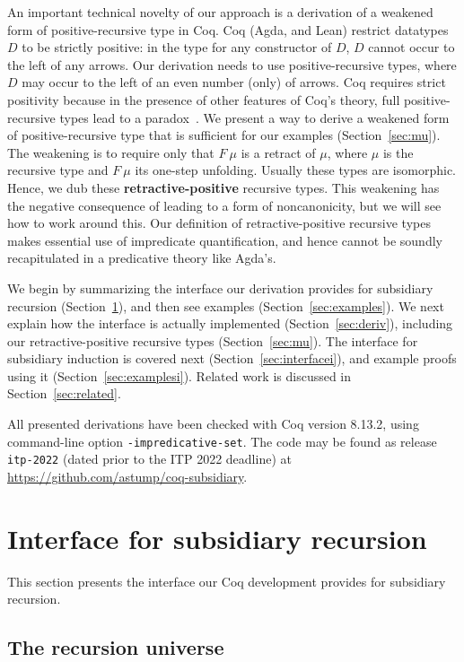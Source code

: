 \documentclass[a4paper,USenglish]{lipics-v2021}
\begin{document}
An important technical novelty of our approach is a derivation of a
weakened form of positive-recursive type in Coq.  Coq (Agda, and Lean)
restrict datatypes $D$ to be strictly positive: in the type for any
constructor of $D$, $D$ cannot occur to the left of any arrows.  Our
derivation needs to use positive-recursive types, where $D$ may occur
to the left of an even number (only) of arrows.  Coq requires strict
positivity because in the presence of other features of Coq's theory,
full positive-recursive types lead to a paradox~\cite{coquand88}.  We
present a way to derive a weakened form of positive-recursive type
that is sufficient for our examples (Section~\ref{sec:mu}).  The
weakening is to require only that $F\ \mu$ is a retract of $\mu$,
where $\mu$ is the recursive type and $F\ \mu$ its one-step unfolding.
Usually these types are isomorphic.  Hence, we dub these
\textbf{retractive-positive} recursive types.  This weakening has the
negative consequence of leading to a form of noncanonicity, but we
will see how to work around this.  Our definition of
retractive-positive recursive types makes essential use of impredicate
quantification, and hence cannot be soundly recapitulated in a
predicative theory like Agda's.

We begin by summarizing the interface our derivation provides for
subsidiary recursion (Section~\ref{sec:interface}), and then see
examples (Section~\ref{sec:examples}).  We next explain how the
interface is actually implemented (Section~\ref{sec:deriv}), including
our retractive-positive recursive types (Section~\ref{sec:mu}).  The
interface for subsidiary induction is covered next
(Section~\ref{sec:interfacei}), and example proofs using it
(Section~\ref{sec:examplesi}).  Related work is discussed in
Section~\ref{sec:related}.

All presented derivations have been checked with Coq version 8.13.2,
using command-line option \verb|-impredicative-set|.  The code may be
found as release \verb|itp-2022| (dated prior to the ITP 2022
deadline) at \url{https://github.com/astump/coq-subsidiary}.

\section{Interface for subsidiary recursion}
\label{sec:interface}

This section presents the interface our Coq development provides
for subsidiary recursion.

\subsection{The recursion universe}
\end{document}
